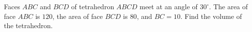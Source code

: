 Faces $ABC$ and $BCD$ of tetrahedron $ABCD$ meet at an angle of $30^\circ$. The area of face $ABC$ is $120$, the area of face $BCD$ is $80$, and $BC=10$. Find the volume of the tetrahedron.
